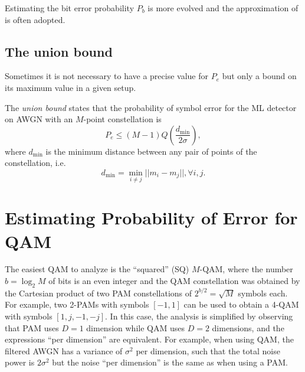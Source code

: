 Estimating the bit error probability $P_b$ is more evolved and the approximation of  is often adopted.

\subsection{The union bound}

Sometimes it is not necessary to have a precise value for $P_e$ but only a bound on its maximum value in a given setup.

The \emph{union bound} states that the probability of symbol error for the ML detector on AWGN with an $M$-point constellation is
$$P_e \le (M-1) Q\left( \frac {d_\textrm{min}} {2\sigma} \right),$$
where $d_\textrm{min}$ is the minimum distance between any pair of points of the constellation, i.e.
$$d_\textrm{min} = \min_{i \ne j} ||m_i - m_j||, \forall i,j.$$



\section{Estimating Probability of Error for QAM}


The easiest QAM to analyze is the ``squared'' (SQ) $M$-QAM, where the number $b=\log_2 M$ of bits is an even integer and the QAM constellation was obtained by the Cartesian product of two PAM constellations of $2^{b/2}=\sqrt{M}$ symbols each. For example, two 2-PAMs with symbols $[-1,1]$ can be used to obtain a 4-QAM with symbols $[1,j,-1,-j]$. In this case, the analysis is simplified by observing that PAM uses $D=1$ dimension while QAM uses $D=2$ dimensions, and the expressions ``per dimension'' are equivalent. For example, when using QAM, the filtered AWGN has a variance of $\sigma^2$ per dimension, such that the total noise power is $2\sigma^2$ but the noise ``per dimension'' is the same as when using a PAM.


